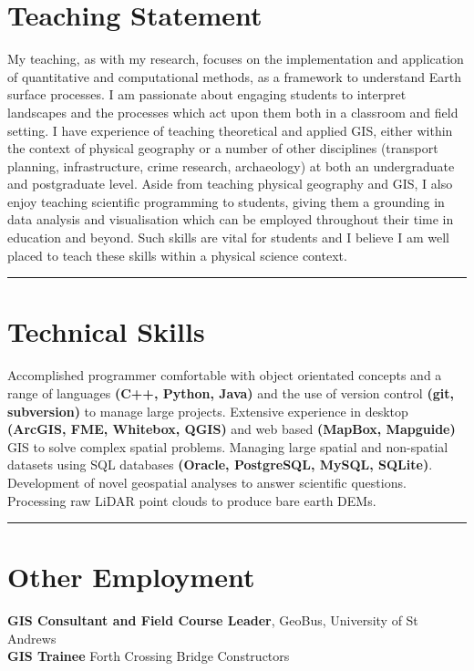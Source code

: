 \documentclass[10pt, a4paper]{article}
\newcommand{\years}[1]{\marginnote{\scriptsize #1}}
\begin{document}
  \section*{Teaching Statement}
  \noindent

  My teaching, as with my research, focuses on the implementation and application of quantitative and computational methods, as a framework to understand Earth surface processes. I am passionate about engaging students to interpret landscapes and the processes which act upon them both in a classroom and field setting. I have experience of teaching theoretical and applied GIS, either within the context of physical geography or a number of other disciplines (transport planning, infrastructure, crime research, archaeology) at both an undergraduate and postgraduate level. Aside from teaching physical geography and GIS, I also enjoy teaching scientific programming to students, giving them a grounding in data analysis and visualisation which can be employed throughout their time in education and beyond. Such skills are vital for students and I believe I am well placed to teach these skills within a physical science context.\\[0.05cm]

  \hrule
  \section*{Technical Skills}
  \noindent

  Accomplished programmer comfortable with object orientated concepts and a range of languages \textbf{(C++, Python, Java)} and the use of version control \textbf{(git, subversion)} to manage large projects. Extensive experience in desktop \textbf{(ArcGIS, FME, Whitebox, QGIS)} and web based \textbf{(MapBox, Mapguide)} GIS to solve complex spatial problems. Managing large spatial and non-spatial datasets using SQL databases \textbf{(Oracle, PostgreSQL, MySQL, SQLite)}. Development of novel geospatial analyses to answer scientific questions. Processing raw LiDAR point clouds to produce bare earth DEMs.\\[0.05cm]

\fi

\hrule
\section*{Other Employment}
\noindent

\years{2015--2016} \textbf{GIS Consultant and Field Course Leader}, GeoBus, University of St Andrews\\[0.05cm]
\years{2012--2013} \textbf{GIS Trainee} Forth Crossing Bridge Constructors\\[0.05cm]
\end{document}
